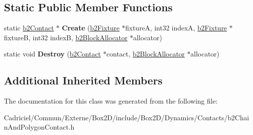 \subsection*{Static Public Member Functions}
\begin{DoxyCompactItemize}
\item 
static \hyperlink{classb2_contact}{b2\+Contact} $\ast$ {\bfseries Create} (\hyperlink{classb2_fixture}{b2\+Fixture} $\ast$fixtureA, int32 indexA, \hyperlink{classb2_fixture}{b2\+Fixture} $\ast$fixtureB, int32 indexB, \hyperlink{classb2_block_allocator}{b2\+Block\+Allocator} $\ast$allocator)\hypertarget{classb2_chain_and_polygon_contact_aae40d48ef8f2a49297a38c615a79e3b2}{}\label{classb2_chain_and_polygon_contact_aae40d48ef8f2a49297a38c615a79e3b2}

\item 
static void {\bfseries Destroy} (\hyperlink{classb2_contact}{b2\+Contact} $\ast$contact, \hyperlink{classb2_block_allocator}{b2\+Block\+Allocator} $\ast$allocator)\hypertarget{classb2_chain_and_polygon_contact_aed8a69453a9d7bb77a3c2b70fb20c764}{}\label{classb2_chain_and_polygon_contact_aed8a69453a9d7bb77a3c2b70fb20c764}

\end{DoxyCompactItemize}
\subsection*{Additional Inherited Members}


The documentation for this class was generated from the following file\+:\begin{DoxyCompactItemize}
\item 
Cadriciel/\+Commun/\+Externe/\+Box2\+D/include/\+Box2\+D/\+Dynamics/\+Contacts/b2\+Chain\+And\+Polygon\+Contact.\+h\end{DoxyCompactItemize}
